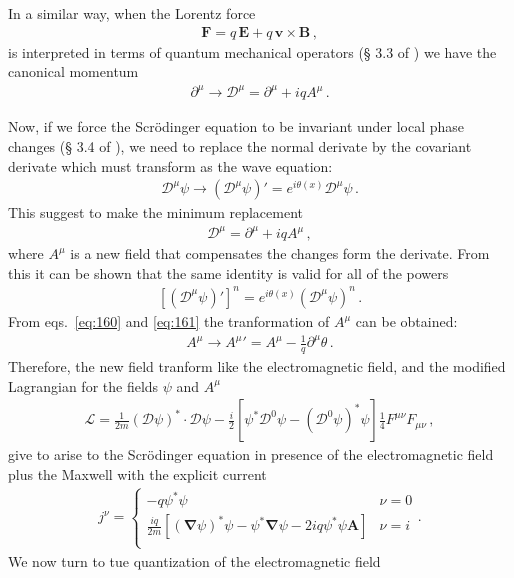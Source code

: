 In a similar way, when the Lorentz force
\begin{align}
  \mathbf{F}=q\, \mathbf{E}+q\, \mathbf{v}\times\mathbf{B}\,,
\end{align}
is interpreted in terms of quantum mechanical operators (\S{} 3.3 of \cite{lsm}) we have the canonical momentum
\begin{align}
  \partial^\mu\to \mathcal{D}^\mu=\partial^\mu+i q A^\mu\,.
\end{align}

Now, if we force the Scr\"odinger equation to be invariant under local phase changes (\S{} 3.4 of \cite{lsm}), we need to replace the normal derivate by the covariant derivate which must transform as the wave equation:
\begin{align}
  \label{eq:160}
  \mathcal{D}^\mu\psi\to (\mathcal{D}^\mu\psi)'=e^{i\theta(x)}\mathcal{D}^\mu\psi\,.
\end{align}
This suggest to make the minimum replacement 
\begin{align}
\label{eq:161}
 \mathcal{D}^\mu=\partial^\mu+i q A^\mu\,,
\end{align}
where $A^\mu$ is a new field that compensates the changes form the derivate. From this it can be shown that the same identity is valid for all of the powers 
\begin{align}
  \left[(\mathcal{D}^\mu\psi)'\right]^n=e^{i\theta(x)}(\mathcal{D}^\mu\psi)^n\,.
\end{align}
From eqs.~\eqref{eq:160} and \eqref{eq:161} the tranformation of $A^\mu$ can be obtained:
\begin{align}
  \label{eq:162}
  A^\mu\to {A^\mu}'=A^\mu-\frac{1}{q}\partial^\mu\theta\,.
\end{align}
Therefore, the new field tranform like the electromagnetic field, and the modified Lagrangian for the fields $\psi$ and $A^\mu$
\begin{align}
  \mathcal{L}=\frac{1}{2m}\left(\mathcal{D}\psi\right)^*\cdot \mathcal{D}\psi
-\frac{i}{2}\left[\psi^*\mathcal{D}^0\psi-\left(\mathcal{D}^0\psi\right)^*\psi\right]
\frac{1}{4}F^{\mu\nu}F_{\mu\nu}\,,
\end{align}
give to arise to the Scr\"odinger equation in presence of the electromagnetic field plus the Maxwell with the explicit current
\begin{align}
  j^\nu=
  \begin{cases}
-q \psi^*\psi & \nu=0\\
\frac{iq}{2m}\left[\left(\boldsymbol{\nabla}\psi\right)^*\psi-\psi^*\boldsymbol{\nabla}\psi-2iq\psi^*\psi \mathbf{A}\right] & \nu=i\\
  \end{cases}.
\end{align}
We now turn to tue quantization of the electromagnetic field

